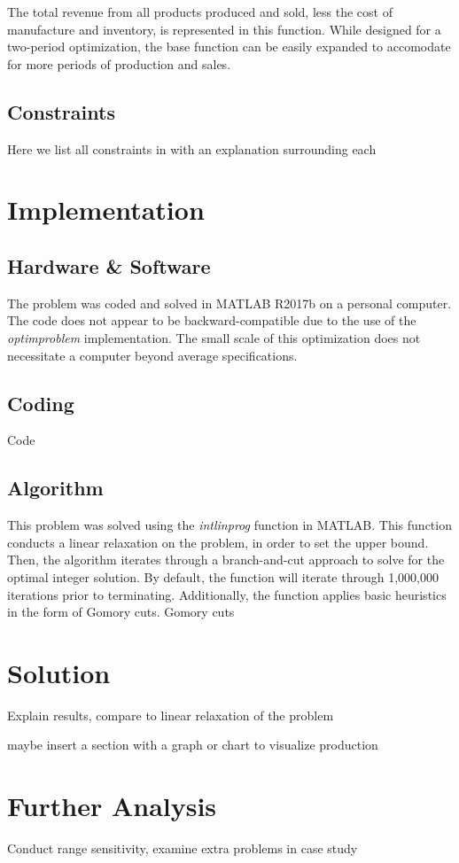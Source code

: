 \documentclass{article}
\begin{document}
The total revenue from all products produced and sold, less the cost of manufacture and inventory, is represented in this function.  While designed for a two-period optimization, the base function can be easily expanded to accomodate for more periods of production and sales.

\subsection{Constraints}
Here we list all constraints in with an explanation surrounding each
\section{Implementation}
\subsection{Hardware \& Software}
The problem was coded and solved in MATLAB R2017b on a personal computer.  The code does not appear to be backward-compatible due to the use of the \textit{optimproblem} implementation.  The small scale of this optimization does not necessitate a computer beyond average specifications.
\subsection{Coding}
Code
\subsection{Algorithm}
This problem was solved using the \textit{intlinprog} function in MATLAB.  This function conducts a linear relaxation on the problem, in order to set the upper bound.  Then, the algorithm iterates through a branch-and-cut approach to solve for the optimal integer solution.  By default, the function 
will iterate through 1,000,000 iterations prior to terminating.  Additionally, the function applies basic heuristics in the form of Gomory cuts.  Gomory cuts 
\section{Solution}
Explain results, compare to linear relaxation of the problem
\par
maybe insert a section with a graph or chart to visualize production
\section{Further Analysis}
Conduct range sensitivity, examine extra problems in case study
\end{document}
